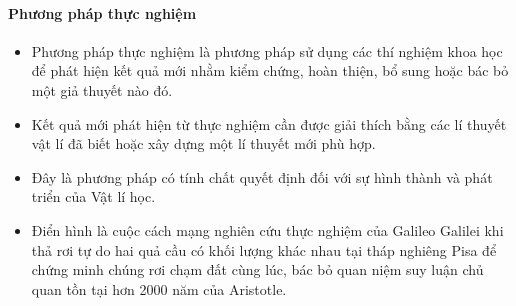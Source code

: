 \paragraph{Phương pháp thực nghiệm}
\begin{itemize}
\item Phương pháp thực nghiệm là phương pháp sử dụng các thí nghiệm khoa học để phát hiện kết quả mới nhằm kiểm chứng, hoàn thiện, bổ sung hoặc bác bỏ một giả thuyết nào đó.
\item Kết quả mới phát hiện từ thực nghiệm cần được giải thích bằng các lí thuyết vật lí đã biết hoặc xây dựng một lí thuyết mới phù hợp.
\item Đây là phương pháp có tính chất quyết định đối với sự hình thành và phát triển của Vật lí học.
\item Điển hình là cuộc cách mạng nghiên cứu thực nghiệm của Galileo Galilei khi thả rơi tự do hai quả cầu có khối lượng khác nhau tại tháp nghiêng Pisa để chứng minh chúng rơi chạm đất cùng lúc, bác bỏ quan niệm suy luận chủ quan tồn tại hơn 2000 năm của Aristotle.
\end{itemize}
